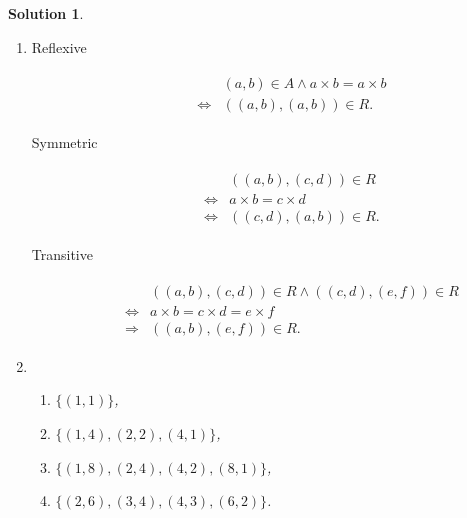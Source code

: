 \documentclass{../../cls/sig-alternate-05-2015}
\newtheorem*{solution*}{Solution}
\begin{document}
\begin{solution*}
    \begin{enumerate}[label=(\alph*)]
        \item \begin{description}
            \item[Reflexive] \begin{align}
                \begin{aligned}
                    & (a, b) \in A \land a \times b = a \times b\\
                    \Leftrightarrow & ((a, b), (a, b)) \in R.
                \end{aligned}
            \end{align}
            \item[Symmetric] \begin{align}
                \begin{aligned}
                & ((a, b), (c, d)) \in R\\
                \Leftrightarrow & a \times b = c \times d\\
                \Leftrightarrow & ((c, d), (a, b)) \in R.
                \end{aligned}
            \end{align}
            \item[Transitive] \begin{align}
                \begin{aligned}
                & ((a, b), (c, d)) \in R \land ((c, d), (e, f)) \in R\\
                \Leftrightarrow & a \times b = c \times d = e \times f\\
                \Rightarrow & ((a, b), (e, f)) \in R.
                \end{aligned}
            \end{align}
        \end{description}
        \item \begin{enumerate}[label=(\roman*)]
            \item $\{(1, 1)\}$,
            \item $\{(1, 4), (2, 2), (4, 1)\}$,
            \item $\{(1, 8), (2, 4), (4, 2), (8, 1)\}$,
            \item $\{(2, 6), (3, 4), (4, 3), (6, 2)\}$.
        \end{enumerate}
    \end{enumerate}
\end{solution*}
\end{document}
